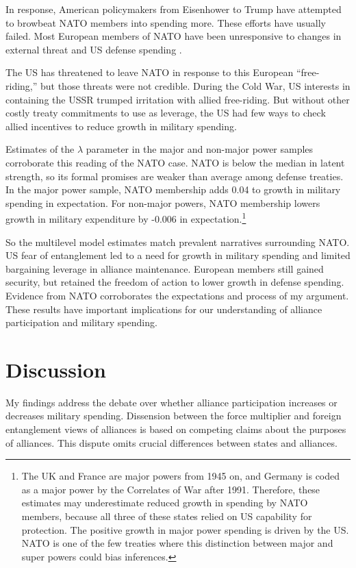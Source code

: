 \documentclass[12pt]{article}
\begin{document}
In response, American policymakers from Eisenhower to Trump have attempted to browbeat NATO members into spending more. 
These efforts have usually failed. 
Most European members of NATO have been unresponsive to changes in external threat and US defense spending \citep{PluemperNeumayer2015}. 


The US has threatened to leave NATO in response to this European ``free-riding,'' but those threats were not credible. 
During the Cold War, US interests in containing the USSR trumped irritation with allied free-riding.  
But without other costly treaty commitments to use as leverage, the US had few ways to check allied incentives to reduce growth in military spending. 


Estimates of the $\lambda$ parameter in the major and non-major power samples corroborate this reading of the NATO case. 
NATO is below the median in latent strength, so its formal promises are weaker than average among defense treaties. 
In the major power sample, NATO membership adds 0.04 to growth in military spending in expectation.
For non-major powers, NATO membership lowers growth in military expenditure by -0.006 in expectation.\footnote{
The UK and France are major powers from 1945 on, and Germany is coded as a major power by the Correlates of War after 1991. Therefore, these estimates may underestimate reduced growth in spending by NATO members, because all three of these states relied on US capability for protection. The positive growth in major power spending is driven by the US. NATO is one of the few treaties where this distinction between major and super powers could bias inferences.}


So the multilevel model estimates match prevalent narratives surrounding NATO.
US fear of entanglement led to a need for growth in military spending and limited bargaining leverage in alliance maintenance. 
European members still gained security, but retained the freedom of action to lower growth in defense spending.   
Evidence from NATO corroborates the expectations and process of my argument. 
These results have important implications for our understanding of alliance participation and military spending. 


\section{Discussion}


My findings address the debate over whether alliance participation increases or decreases military spending. 
Dissension between the force multiplier and foreign entanglement views of alliances is based on competing claims about the purposes of alliances. 
This dispute omits crucial differences between states and alliances. 
\end{document}
